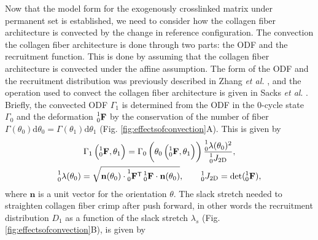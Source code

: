 Now that the model form for the exogenously crosslinked matrix under permanent set is established, we need to consider how the collagen fiber architecture is convected by the change in reference configuration. 
The convection the collagen fiber architecture is done through two parts: the ODF and the recruitment function. 
This is done by assuming that the collagen fiber architecture is convected under the affine assumption\cite{lee_presence_2015}. 
The form of the ODF and the recruitment distribution was previously described in Zhang \textit{et al.} \cite{zhang_meso_2016}, and the operation used to convect the collagen fiber architecture is given in Sacks \textit{et al}. \cite{sacks_novel_2016}. 
Briefly, the convected ODF $\Gamma_1$ is determined from the ODF in the 0-cycle state $\Gamma_0$ and the deformation $\prescript{1}{0}{\mathbf{F}}$ by the conservation of the number of fiber $\Gamma(\theta_0) \mathrm{d}\theta_0 = \Gamma(\theta_1) \mathrm{d}\theta_1$ (Fig. \ref{fig:effectsofconvection}A). This is given by
\begin{equation} \label{eq:pfODF}
\begin{gathered}
\Gamma_1\left( \prescript{1}{0}{\mathbf{F}},\theta_1 \right) = \Gamma_0\left( \theta_0\left( \prescript{1}{0}{\mathbf{F}},\theta_1\right)\right)\frac{\prescript{1}{0}{\lambda(\theta_0)}^2}{\prescript{1}{0}{J_\mathrm{2D}}}, \\
\prescript{1}{0}{\lambda(\theta_0)} = \sqrt{\mathbf{n}(\theta_0)\cdot  \prescript{1}{0}{\mathbf{F}^\mathsf{T}}  \prescript{1}{0}{\mathbf{F}} \cdot \mathbf{n}(\theta_0)}, \qquad \prescript{1}{0}{J_\mathrm{2D}} =\det (\prescript{1}{0}{\mathbf{F}}),
\end{gathered}
\end{equation}
where $\mathbf{n}$ is a unit vector for the orientation $\theta$.
The slack stretch needed to straighten collagen fiber crimp after push forward, in other words the recruitment distribution $D_1$ as a function of the slack stretch $\lambda_s$ (Fig. \ref{fig:effectsofconvection}B), is given by
